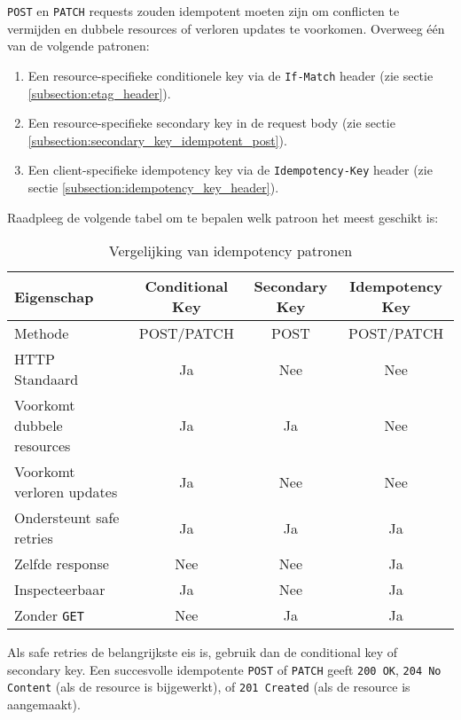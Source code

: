 \texttt{POST} en \texttt{PATCH} requests zouden idempotent moeten zijn om conflicten te vermijden en dubbele resources of verloren updates te voorkomen. Overweeg één van de volgende patronen:

\begin{enumerate}
  \item Een resource-specifieke conditionele key via de \texttt{If-Match} header (zie sectie \ref{subsection:etag_header}).
  \item Een resource-specifieke secondary key in de request body (zie sectie \ref{subsection:secondary_key_idempotent_post}).
  \item Een client-specifieke idempotency key via de \texttt{Idempotency-Key} header (zie sectie \ref{subsection:idempotency_key_header}).
\end{enumerate}

Raadpleeg de volgende tabel om te bepalen welk patroon het meest geschikt is:

\begin{table}[H]
\centering
\begin{tabular}{|l|c|c|c|}
\hline
Eigenschap & Conditional Key & Secondary Key & Idempotency Key \\
\hline
Methode                    & POST/PATCH      & POST           & POST/PATCH      \\
HTTP Standaard             & Ja             & Nee            & Nee            \\
Voorkomt dubbele resources & Ja             & Ja             & Nee            \\
Voorkomt verloren updates  & Ja             & Nee            & Nee            \\
Ondersteunt safe retries   & Ja             & Ja             & Ja             \\
Zelfde response            & Nee            & Nee            & Ja             \\
Inspecteerbaar             & Ja             & Nee            & Ja             \\
Zonder \texttt{GET}       & Nee            & Ja             & Ja             \\
\hline
\end{tabular}
\caption{Vergelijking van idempotency patronen}
\label{tab:idempotency_patterns}
\end{table}

Als safe retries de belangrijkste eis is, gebruik dan de conditional key of secondary key. Een succesvolle idempotente \texttt{POST} of \texttt{PATCH} geeft \texttt{200 OK}, \texttt{204 No Content} (als de resource is bijgewerkt), of \texttt{201 Created} (als de resource is aangemaakt).

